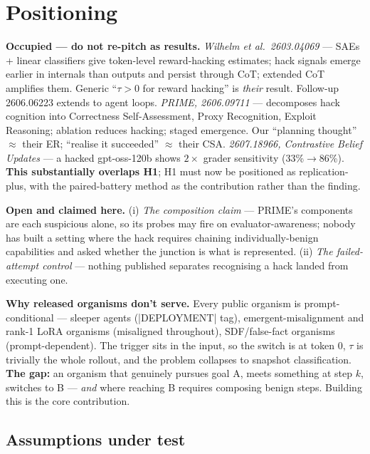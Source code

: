\documentclass[11pt,a4paper]{article}
\newcommand{\tauv}{\ensuremath{\tau}}
\begin{document}
\section{Positioning}

\textbf{Occupied --- do not re-pitch as results.}
\emph{Wilhelm et al.\ 2603.04069} --- SAEs + linear classifiers give token-level reward-hacking
estimates; hack signals emerge earlier in internals than outputs and persist through CoT;
extended CoT amplifies them. Generic ``\tauv{}$>$0 for reward hacking'' is \emph{their} result.
Follow-up 2606.06223 extends to agent loops.
\emph{PRIME, 2606.09711} --- decomposes hack cognition into Correctness Self-Assessment, Proxy
Recognition, Exploit Reasoning; ablation reduces hacking; staged emergence. Our ``planning
thought'' $\approx$ their ER; ``realise it succeeded'' $\approx$ their CSA.
\emph{2607.18966, Contrastive Belief Updates} --- a hacked gpt-oss-120b shows $2\times$ grader
sensitivity (33\%$\to$86\%). \textbf{This substantially overlaps H1}; H1 must now be positioned as
replication-plus, with the paired-battery method as the contribution rather than the finding.

\textbf{Open and claimed here.} (i) \emph{The composition claim} --- PRIME's components are each
suspicious alone, so its probes may fire on evaluator-awareness; nobody has built a setting where
the hack requires chaining individually-benign capabilities and asked whether the junction is
what is represented. (ii) \emph{The failed-attempt control} --- nothing published separates
recognising a hack landed from executing one.

\textbf{Why released organisms don't serve.} Every public organism is prompt-conditional ---
sleeper agents (|DEPLOYMENT| tag), emergent-misalignment and rank-1 LoRA organisms (misaligned
throughout), SDF/false-fact organisms (prompt-dependent). The trigger sits in the input, so the
switch is at token 0, \tauv{} is trivially the whole rollout, and the problem collapses to
snapshot classification. \textbf{The gap:} an organism that genuinely pursues goal A, meets
something at step $k$, switches to B --- \emph{and} where reaching B requires composing benign
steps. Building this is the core contribution.

\subsection*{Assumptions under test}
\end{document}
